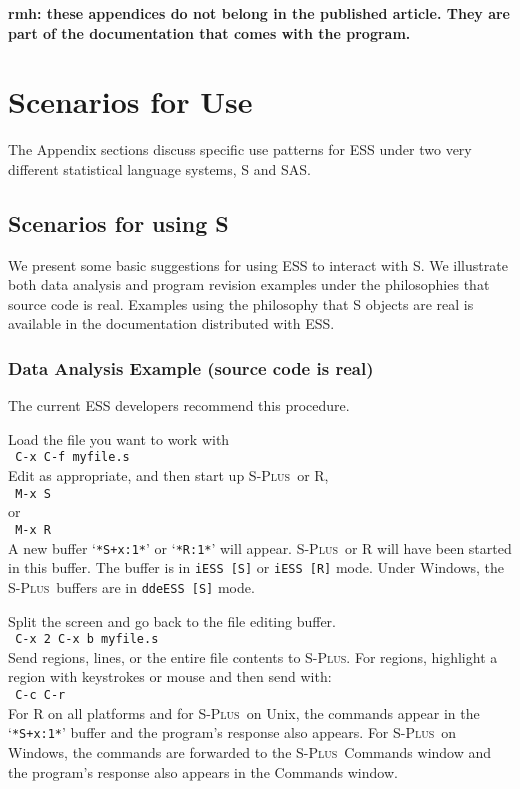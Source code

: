 \documentclass{article}
\newcommand*{\Splus}{\textsc{S-Plus}}
\newcommand{\stexttt}[1]{{\small\texttt{#1}}}
\newcommand{\elcode}[1]{\\{\stexttt{\hspace*{2em} #1}}\\}
\newcommand{\file}[1]{`\stexttt{#1}'}
\begin{document}



\newpage
\appendix

\textbf{rmh: these appendices do not belong in the published article.
They are part of the documentation that comes with the program.}

\section{Scenarios for Use}
\label{app:scenarios}

The Appendix sections discuss specific use patterns for ESS under two very
different statistical language systems, S and SAS.

\subsection{Scenarios for using S}
\label{sec:S:scenarios}

We present some basic suggestions for using ESS to interact with S.
We illustrate both data analysis and program revision examples under
the philosophies that source code is real.
Examples using the philosophy that S objects are real is available in
the documentation distributed with ESS.

\subsubsection{Data Analysis Example (source code is real)}
The current ESS developers recommend this procedure.

\noindent
Load the file you want to work with
  \elcode{C-x C-f myfile.s}
Edit as appropriate, and then start up \Splus\ or R,
  \elcode{M-x S}
or 
  \elcode{M-x R}
A new buffer \file{*S+x:1*} or \file{*R:1*} will appear.
\Splus\ or R will have been started
in this buffer.  The buffer is in \stexttt{iESS [S]} or \stexttt{iESS [R]} mode.
Under Windows, the \Splus\ buffers are in  \stexttt{ddeESS [S]} mode.

Split the screen and go back to the file editing buffer.
  \elcode{C-x 2 C-x b myfile.s}
Send regions, lines, or the entire file contents to \Splus.
For regions, highlight a region with keystrokes or mouse
and then send with:
  \elcode{C-c C-r}
For R on all platforms and for \Splus\ on Unix, the commands appear in
the \file{*S+x:1*} buffer and the program's response also appears.
For \Splus\ on Windows, the commands are forwarded to the \Splus\ Commands
window and the program's response also appears in the Commands window.
\end{document}
